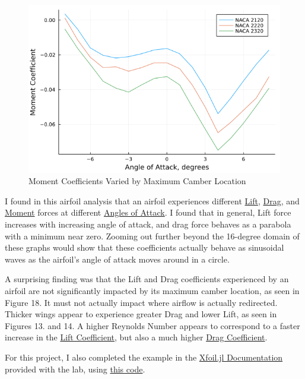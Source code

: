 \documentclass{article}
\begin{document}
\begin{figure}[!htb]
\endminipage\hfill
{}
  \includegraphics[width=\linewidth]{Figure18.png}
  \caption{Moment Coefficients Varied by Maximum Camber Location}\label{fig:18}
\endminipage
\end{figure}

I found in this airfoil analysis that an airfoil experiences different \hyperlink{CL}{Lift}, \hyperlink{CL}{Drag}, and \hyperlink{CM}{Moment} forces at different \hyperlink{alpha}{Angles of Attack}. I found that in general, Lift force increases with increasing angle of attack, and drag force behaves as a parabola with a minimum near zero. Zooming out further beyond the 16-degree domain of these graphs would show that these coefficients actually behave as sinusoidal waves as the airfoil's angle of attack moves around in a circle.\newline

A surprising finding was that the Lift and Drag coefficients experienced by an airfoil are not significantly impacted by its maximum camber location, as seen in Figure 18. It must not actually impact where airflow is actually redirected. Thicker wings appear to experience greater Drag and lower Lift, as seen in Figures 13. and 14. A higher Reynolds Number appears to correspond to a faster increase in the \hyperlink{CL}{Lift Coefficient}, but also a much higher \hyperlink{CD}{Drag Coefficient}.

For this project, I also completed the example in the \href{https://flow.byu.edu/Xfoil.jl/stable/}{Xfoil.jl Documentation} provided with the lab, using \href{https://github.com/JoeSpencer1/497R-Projects/blob/Airfoil-Analysis/Demo.jl}{this code}.

\clearpage
\end{document}
